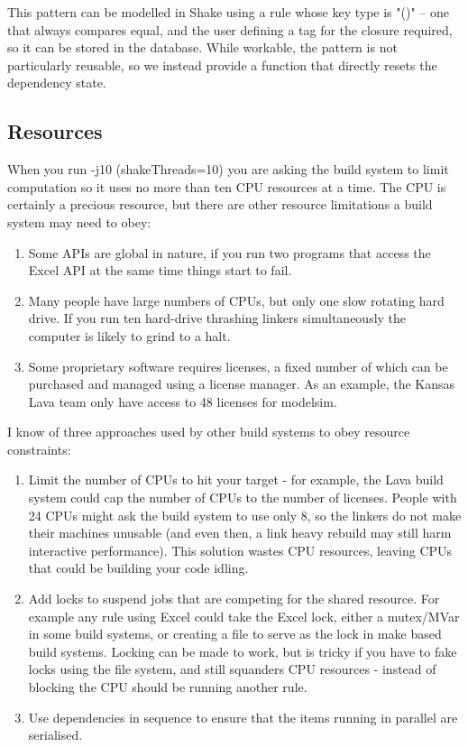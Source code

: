 This pattern can be modelled in Shake using a rule whose key type is \lst"()" -- one that always compares equal, and the user defining a tag for the closure required, so it can be stored in the database. While workable, the pattern is not particularly reusable, so we instead provide a function that directly resets the dependency state.

\subsection{Resources}

When you run -j10 (shakeThreads=10) you are asking the build system to limit computation so it uses no more than ten CPU resources at a time. The CPU is certainly a precious resource, but there are other resource limitations a build system may need to obey:

\begin{enumerate}
\item Some APIs are global in nature, if you run two programs that access the Excel API at the same time things start to fail.
\item Many people have large numbers of CPUs, but only one slow rotating hard drive. If you run ten hard-drive thrashing linkers simultaneously the computer is likely to grind to a halt.
\item Some proprietary software requires licenses, a fixed number of which can be purchased and managed using a license manager. As an example, the Kansas Lava team only have access to 48 licenses for modelsim.
\end{enumerate}

I know of three approaches used by other build systems to obey resource constraints:

\begin{enumerate}
\item Limit the number of CPUs to hit your target - for example, the Lava build system could cap the number of CPUs to the number of licenses. People with 24 CPUs might ask the build system to use only 8, so the linkers do not make their machines unusable (and even then, a link heavy rebuild may still harm interactive performance). This solution wastes CPU resources, leaving CPUs that could be building your code idling.
\item Add locks to suspend jobs that are competing for the shared resource. For example any rule using Excel could take the Excel lock, either a mutex/MVar in some build systems, or creating a file to serve as the lock in make based build systems. Locking can be made to work, but is tricky if you have to fake locks using the file system, and still squanders CPU resources - instead of blocking the CPU should be running another rule.
\item Use dependencies in sequence to ensure that the items running in parallel are serialised.
\end{enumerate}

